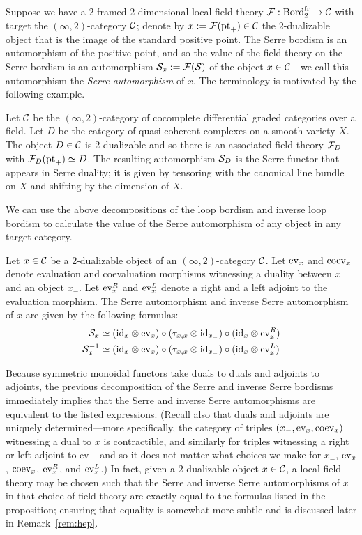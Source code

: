 \documentclass{amsart}
\begin{document}
Suppose we have a 2-framed 2-dimensional local field theory $\mathcal F: \mathrm{Bord}^\mathrm{fr}_2 \rightarrow \mathcal C$ with target the $(\infty,2)$-category $\mathcal C$; denote by $x:=\mathcal F(\mathrm{pt}_+) \in \mathcal C$ the 2-dualizable object that is the image of the standard positive point.  The Serre bordism is an automorphism of the positive point, and so the value of the field theory on the Serre bordism is an automorphism $\mathcal S_x := \mathcal F(\mathcal S)$ of the object $x \in \mathcal C$---we call this automorphism the \emph{Serre automorphism} of $x$.  The terminology is motivated by the following example.

\begin{example} \label{eg:serrefunctor}
Let $\mathcal C$ be the $(\infty,2)$-category of cocomplete differential graded categories over a field.  Let $D$ be the category of quasi-coherent complexes on a smooth variety $X$.  The object $D \in \mathcal C$ is 2-dualizable and so there is an associated field theory $\mathcal F_D$ with $\mathcal F_D(\mathrm{pt}_+) \simeq D$.  The resulting automorphism $\mathcal S_D$ is the Serre functor that appears in Serre duality; it is given by tensoring with the canonical line bundle on $X$ and shifting by the dimension of $X$.
\end{example} %

We can use the above decompositions of the loop bordism and inverse loop bordism to calculate the value of the Serre automorphism of any object in any target category.
\begin{proposition} \label{prop:serrecalc}
Let $x \in \mathcal C$ be a 2-dualizable object of an $(\infty,2)$-category $\mathcal C$.  Let $\mathrm{ev}_x$ and $\mathrm{coev}_x$ denote evaluation and coevaluation morphisms witnessing a duality between $x$ and an object $x_-$.  Let $\mathrm{ev}_x^R$ and $\mathrm{ev}_x^L$ denote a right and a left adjoint to the evaluation morphism.  The Serre automorphism and inverse Serre automorphism of $x$ are given by the following formulas:
	\begin{align*}
		\mathcal S_x &\simeq (\mathrm{id}_{x} \otimes \mathrm{ev}_{x}) \circ (\tau_{x, x} \otimes \mathrm{id}_{x_-}) \circ (\mathrm{id}_{x} \otimes \mathrm{ev}_{x}^R) \\
		\mathcal S_x^{-1} &\simeq (\mathrm{id}_{x} \otimes \mathrm{ev}_{x}) \circ (\tau_{x, x} \otimes \mathrm{id}_{x_-}) \circ (\mathrm{id}_{x} \otimes \mathrm{ev}_{x}^L)
	\end{align*}
\end{proposition}
\nid Because symmetric monoidal functors take duals to duals and adjoints to adjoints, the previous decomposition of the Serre and inverse Serre bordisms immediately implies that the Serre and inverse Serre automorphisms are equivalent to the listed expressions.  (Recall also that duals and adjoints are uniquely determined---more specifically, the category of triples $(x_-,\mathrm{ev}_x,\mathrm{coev}_x)$ witnessing a dual to $x$ is contractible, and similarly for triples witnessing a right or left adjoint to $\mathrm{ev}$---and so it does not matter what choices we make for $x_-$, $\mathrm{ev}_x$, $\mathrm{coev}_x$, $\mathrm{ev}_x^R$, and $\mathrm{ev}_x^L$.)  In fact, given a 2-dualizable object $x \in \mathcal C$, a local field theory may be chosen such that the Serre and inverse Serre automorphisms of $x$ in that choice of field theory are exactly equal to the formulas listed in the proposition; ensuring that equality is somewhat more subtle and is discussed later in Remark~\ref{rem:hep}.
\end{document}
